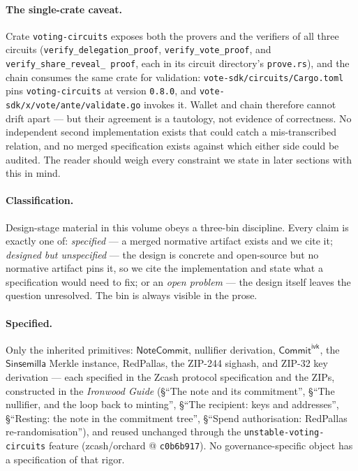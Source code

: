 \documentclass[11pt,a4paper]{article}
\theoremstyle{definition}
\newcommand{\NoteCommit}{\ensuremath{\mathsf{NoteCommit}}}
\newcommand{\Sinsemilla}{\ensuremath{\mathsf{Sinsemilla}}}
\newcommand{\CommitIvk}{\ensuremath{\mathsf{Commit}^{\mathsf{ivk}}}}
\begin{document}
\paragraph{The single-crate caveat.} Crate \texttt{voting-circuits} exposes
both the provers and the verifiers of all three circuits
(\texttt{verify\_\allowbreak delegation\_\allowbreak proof},
\texttt{verify\_\allowbreak vote\_\allowbreak proof}, and
\texttt{verify\_\allowbreak share\_\allowbreak reveal\_\allowbreak
proof}, each in its circuit directory's
\texttt{prove.rs}), and the
chain consumes the same crate for validation:
\texttt{vote-sdk/circuits/Cargo.toml} pins \texttt{voting-circuits} at
version \texttt{0.8.0}, and \texttt{vote-sdk/x/vote/ante/validate.go}
invokes it. Wallet and chain therefore
cannot drift apart --- but their agreement is a tautology, not evidence of
correctness. No independent second implementation exists that could catch a
mis-transcribed relation, and no merged specification exists against which
either side could be audited. The reader should weigh every constraint we
state in later sections with this in mind.

\paragraph{Classification.} Design-stage material in this volume obeys a
three-bin discipline. Every claim is exactly one of: \emph{specified} --- a
merged normative artifact exists and we cite it; \emph{designed but
unspecified} --- the design is concrete and open-source but no normative
artifact pins it, so we cite the implementation and state what a
specification would need to fix; or an \emph{open problem} --- the design
itself leaves the question unresolved. The bin is always visible in the
prose.

\paragraph{Specified.} Only the inherited primitives: \NoteCommit{},
nullifier derivation, \CommitIvk{}, the \Sinsemilla{} Merkle instance,
RedPallas, the ZIP-244 sighash, and ZIP-32 key derivation --- each specified
in the Zcash protocol specification and the ZIPs, constructed in the
\emph{Ironwood Guide} (\S``The note and its commitment'', \S``The nullifier,
and the loop back to minting'', \S``The recipient: keys and addresses'',
\S``Resting: the note in the commitment tree'', \S``Spend authorisation:
RedPallas re-randomisation''), and reused unchanged through the
\texttt{unstable-voting-circuits} feature (zcash/orchard @
\texttt{c0b6b917}). No governance-specific object has a specification of
that rigor.
\end{document}
